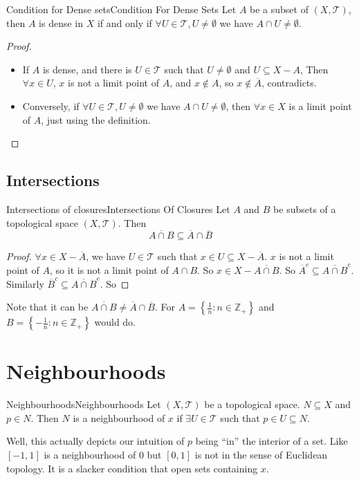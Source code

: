 \documentclass[../main.tex]{subfiles}
\begin{document}
\begin{theorem}{Condition for Dense sets}{Condition For Dense Sets}
Let $A$ be a subset of $(X,\mathcal{T})$, then $A$ is dense in $X$ if and only if $\forall U\in \mathcal{T}, U\neq \emptyset $ we have $A\cap U \neq \emptyset $.
\end{theorem}
\begin{proof}
\begin{itemize}
\item If $A$ is dense, and there is $U\in \mathcal{T}$ such that $U\neq \emptyset $ and $U \subseteq X-A$, Then $\forall x\in U$, $x$ is not a limit point of $A$, and $x\notin A$, so $x\notin \overline{A}$, contradicts.
\item Conversely, if $\forall U\in \mathcal{T}, U\neq \emptyset $ we have $A\cap U \neq \emptyset $, then $\forall x\in X$ is a limit point of $A$, just using the definition.
\end{itemize}
\end{proof}


\subsection{Intersections}
\begin{theorem}{Intersections of closures}{Intersections Of Closures}
Let $A$ and $B$ be subsets of a topological space $(X,\mathcal{T})$. Then
\begin{equation}
\overline{A\cap B} \subseteq \overline{A}\cap \overline{B}
\end{equation}
\end{theorem}
\begin{proof}
$\forall x\in X-\overline{A}$, we have $U\in \mathcal{T}$ such that $x\in U \subseteq X- \overline{A}$. $x$ is not a limit point of $A$, so it is not a limit point of $A\cap B$. So $x\in X- \overline{A\cap B}$. So $\overline{A}^c \subseteq \overline{A\cap B}^c$. Similarly $\overline{B}^c \subseteq \overline{A\cap B}^c$. So  \subseteq {}\cap {}
\end{proof}

Note that it can be $\overline{A\cap B} \neq \overline{A}\cap \overline{B}$. For $A = \left\{ \frac{1}{n}: n\in \mathbb{Z}_+ \right\}$ and $B = \left\{ -\frac{1}{n}: n\in \mathbb{Z}_+ \right\}$ would do.

\section{Neighbourhoods}
\begin{definition}{Neighbourhoods}{Neighbourhoods}
Let $(X,\mathcal{T})$ be a topological space.  $N \subseteq X$ and $p\in N$. Then $N$ is a neighbourhood of $x$ if $\exists U\in \mathcal{T}$ such that $p\in U \subseteq N$.
\end{definition}
Well, this actually depicts our intuition of $p$ being ``in'' the interior of a set. Like $[-1,1]$ is a neighbourhood of $0$ but $[0,1]$ is not in the sense of Euclidean topology. It is a slacker condition that open sets containing $x$.
\end{document}
